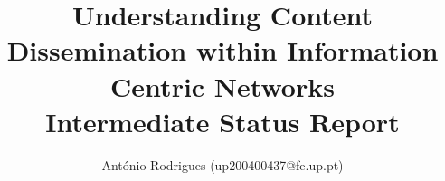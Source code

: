 \documentclass[english,9pt]{article}
\begin{document}
\title{{\textbf{Understanding Content Dissemination within Information Centric 
Networks}} \\ {\large Intermediate Status Report}}
\author{António Rodrigues (up200400437@fe.up.pt)}

\maketitle







\end{document}
